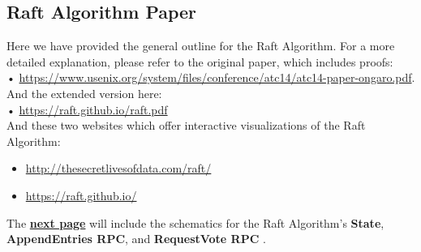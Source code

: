 \subsection{Raft Algorithm Paper}
\noindent
Here we have provided the general outline for the Raft Algorithm. For a more detailed explanation, please refer to the original paper, which includes proofs:\\
• \href{https://www.usenix.org/system/files/conference/atc14/atc14-paper-ongaro.pdf}{https://www.usenix.org/system/files/conference/atc14/atc14-paper-ongaro.pdf}.\\
And the extended version here:\\
• \href{https://raft.github.io/raft.pdf}{https://raft.github.io/raft.pdf}\\
And these two websites which offer interactive visualizations of the Raft Algorithm:
\begin{itemize}
    \item \href{http://thesecretlivesofdata.com/raft/}{http://thesecretlivesofdata.com/raft/}
    \item \href{https://raft.github.io/}{https://raft.github.io/}
\end{itemize}
The \underline{\textbf{next page}} will include the schematics for the Raft Algorithm's \textbf{State}, \textbf{AppendEntries RPC}, and \textbf{RequestVote RPC} \cite{184040}.
\newpage
